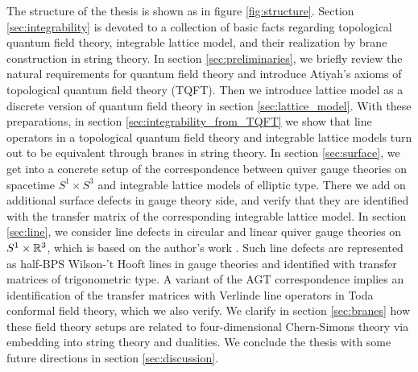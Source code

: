 The structure of the thesis is shown as in figure \ref{fig:structure}.
Section \ref{sec:integrability} is devoted to a collection of basic facts regarding
topological quantum field theory, integrable lattice model, and
their realization by brane construction in string theory.
In section \ref{sec:preliminaries}, we briefly review the natural requirements for quantum field theory
and introduce Atiyah's axioms of topological quantum field theory (TQFT). Then we introduce lattice model as
a discrete version of quantum field theory in section \ref{sec:lattice_model}.
With these preparations, in section \ref{sec:integrability_from_TQFT}
we show that line operators in a topological quantum field theory and
integrable lattice models turn out to be equivalent through branes in string theory.
In section \ref{sec:surface}, we get into a concrete setup of the correspondence
between quiver gauge theories on spacetime $S^1\times S^3$ and
integrable lattice models of elliptic type.
There we add on additional surface defects in gauge theory side, and verify that they are
identified with the transfer matrix of the corresponding integrable lattice model.
In section \ref{sec:line}, we consider line defects in circular and linear quiver gauge
theories on $S^1\times \mathbb{R}^3$, which is based on the author's work \cite{Maruyoshi:2020cwy}.
Such line defects are represented as half-BPS Wilson-'t Hooft lines in gauge theories and
identified with transfer matrices of trigonometric type.
A variant of the AGT correspondence implies an identification of the transfer matrices with
Verlinde line operators in Toda conformal field theory, which we also verify.
We clarify in section \ref{sec:branes} how these field theory setups are
related to four-dimensional Chern-Simons theory via embedding into string theory and dualities.
We conclude the thesis with some future directions in section \ref{sec:discussion}.


